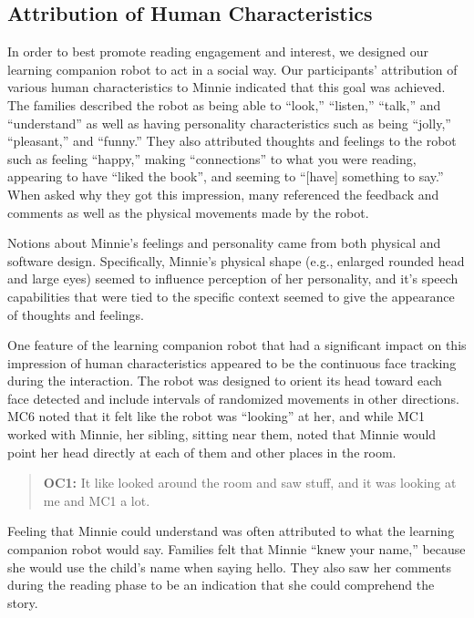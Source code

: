 \documentclass{sigchi}
\begin{document}
\subsection{Attribution of Human Characteristics}
In order to best promote reading engagement and interest, we designed our learning companion robot to act in a social way. Our participants' attribution of various human characteristics to Minnie indicated that this goal was achieved. The families described the robot as being able to ``look,'' ``listen,'' ``talk,'' and ``understand'' as well as having personality characteristics such as being ``jolly,'' ``pleasant,'' and ``funny.'' They also attributed thoughts and feelings to the robot such as feeling ``happy,'' making ``connections'' to what you were reading, appearing to have ``liked the book'', and seeming to ``[have] something to say.'' When asked why they got this impression, many referenced the feedback and comments as well as the physical movements made by the robot. 

Notions about Minnie's feelings and personality came from both physical and software design. Specifically, Minnie's physical shape (e.g., enlarged rounded head and large eyes) seemed to influence perception of her personality, and it's speech capabilities that were tied to the specific context seemed to give the appearance of thoughts and feelings. 

One feature of the learning companion robot that had a significant impact on this impression of human characteristics appeared to be the continuous face tracking during the interaction. The robot was designed to orient its head toward each face detected and include intervals of randomized movements in other directions. MC6 noted that it felt like the robot was ``looking'' at her, and while MC1 worked with Minnie, her sibling, sitting near them, noted that Minnie would point her head directly at each of them and other places in the room.


	 \begin{quote}
	 	 \textbf{OC1:} It like looked around the room and saw stuff, and it was looking at me and MC1 a lot.
	 \end{quote}
	
Feeling that Minnie could understand was often attributed to what the learning companion robot would say. Families felt that Minnie ``knew your name,'' because she would use the child's name when saying hello. They also saw her comments during the reading phase to be an indication that she could comprehend the story.
\end{document}
